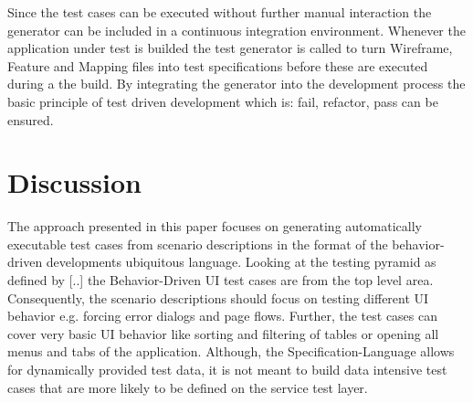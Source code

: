 \documentclass{sig-alternate-05-2015}
\begin{document}
Since the test cases can be executed without further manual interaction the generator can be included in a continuous integration environment.
Whenever the application under test is builded the test generator is called to turn Wireframe, Feature and Mapping files into test specifications before these are executed during a the build.
By integrating the generator into the development process the basic principle of test driven development which is: fail, refactor, pass can be ensured.


\section{Discussion}\label{sec:Discussion}
The approach presented in this paper focuses on generating automatically executable test cases from scenario descriptions in the format of the behavior-driven developments ubiquitous language.
Looking at the testing pyramid as defined by [..] the Behavior-Driven UI test cases are from the top level area.
Consequently, the scenario descriptions should focus on testing different UI behavior e.g. forcing error dialogs and page flows.
Further, the test cases can cover very basic UI behavior like sorting and filtering of tables or opening all menus and tabs of the application. 
Although, the Specification-Language allows for dynamically provided test data, it is not meant to build data intensive test cases that are more likely to be defined on the service test layer.
\end{document}
